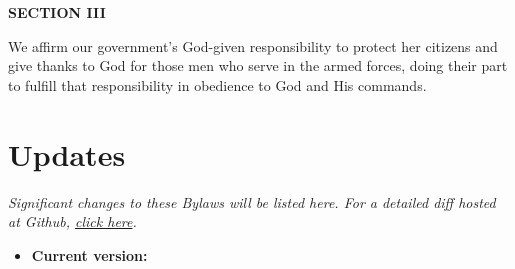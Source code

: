 \documentclass[
]{book}
\providecommand{\tightlist}{%
  \setlength{\itemsep}{0pt}\setlength{\parskip}{0pt}}
\begin{document}
\textbf{SECTION III}

We affirm our government's God-given responsibility to protect her citizens and give thanks to God for those men who serve in the armed forces, doing their part to fulfill that responsibility in obedience to God and His commands.

\hypertarget{updates}{%
\chapter*{Updates}\label{updates}}

\emph{Significant changes to these Bylaws will be listed here. For a detailed diff hosted at Github, \href{https://github.com/Trinity-Reformed-Church/trc-bylaws}{click here}.}

\begin{itemize}
\tightlist
\item
  \textbf{Current version:}
\end{itemize}
\end{document}
